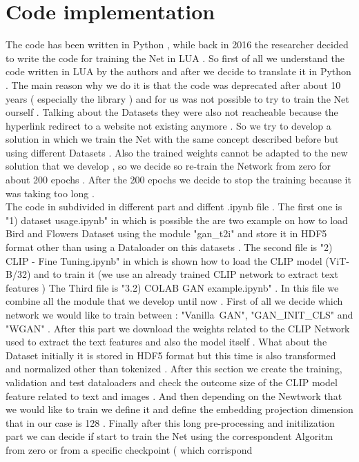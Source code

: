 
\section*{Code implementation }
The code has been written in Python , while back in 2016 the researcher 
decided to write the code for training the Net in LUA .
So first of all we understand the code written in LUA by the authors and 
after we decide to translate it in Python . 
The main reason why we do it is that the code was deprecated after about 10 years (
especially the library ) and for us was not possible to try to train the Net 
ourself . 
Talking about the Datasets they were also not reacheable because the hyperlink redirect 
to a website not existing anymore .
So we try to develop a solution in which we train the Net with the same concept described 
before but using different Datasets .  
Also the trained weights cannot be adapted to the new solution that we develop ,
so we decide so re-train the Network from zero for about 200 epochs .
After the 200 epochs we decide to stop the training because it was taking too long .
\\
The code in subdivided in different part and diffent .ipynb file .
The first one is "1) dataset usage.ipynb" in which is possible the are two example 
on how to load Bird and Flowers Dataset using the module "gan\_t2i" and store it in HDF5 format 
other than using a Dataloader on this datasets .
The second file is "2) CLIP - Fine Tuning.ipynb" in which is shown how to load the CLIP model 
(ViT-B/32) and to train it (we use an already trained CLIP network to extract text features )
The Third file is "3.2) COLAB GAN example.ipynb" . In this file we combine all the 
module that we develop until now . 
First of all we decide which network we would like to train between : "Vanilla\ GAN", "GAN\_INIT\_CLS" 
and "WGAN" . 
After this part we download the weights related to the CLIP Network used to extract 
the text features and also the model itself .
What about the Dataset initially it is stored in HDF5 format but this time is also 
transformed and normalized other than tokenized .
After this section we create the training, validation and test dataloaders and check the 
outcome size of the CLIP model feature related to text and images .
And then depending on the Newtwork that we would like to train 
we define it and define the embedding projection dimension that in our case is 128 .
Finally after this long pre-processing and initilization part we can decide if start to train
the Net using the correspondent Algoritm from zero or from a specific checkpoint ( which corrispond
